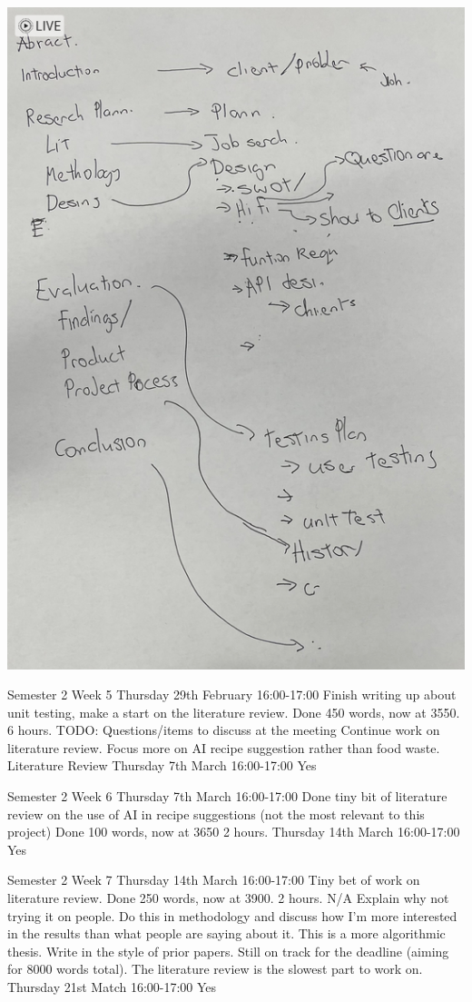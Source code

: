 \documentclass[../CHEFCookingHelper.tex]{subfiles}
\begin{document}
\includegraphics[angle=90,width=\textwidth]{appendicies/report_structure.png}

\logbookentry
{Semester 2 Week 5}
{Thursday 29th February 16:00-17:00}
{Finish writing up about unit testing, make a start on the literature review.
Done 450 words, now at 3550.}
{6 hours.}
{TODO: Questions/items to discuss at the meeting}
{Continue work on literature review. Focus more on AI recipe suggestion rather than
food waste.}
{Literature Review}
{Thursday 7th March 16:00-17:00}
{Yes}

\logbookentry
{Semester 2 Week 6}
{Thursday 7th March 16:00-17:00}
{Done tiny bit of literature review on the use of AI in recipe suggestions (not the most relevant to this project)
Done 100 words, now at 3650}
{2 hours.}
{}
{}
{}
{Thursday 14th March 16:00-17:00}
{Yes}

\logbookentry
{Semester 2 Week 7}
{Thursday 14th March 16:00-17:00}
{Tiny bet of work on literature review. Done 250 words, now at 3900.}
{2 hours.}
{N/A}
{Explain why not trying it on people. Do this in methodology and discuss how I'm more interested in the results than what people are saying about it. This is a
more algorithmic thesis. Write in the style of prior papers.}
{Still on track for the deadline (aiming for 8000 words total). The literature review is the slowest part to work on.}
{Thursday 21st Match 16:00-17:00}
{Yes}
\end{document}
